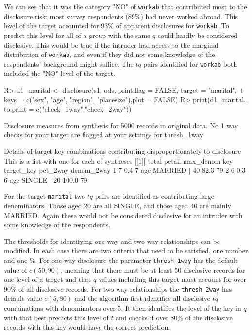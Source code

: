 \documentclass[12pt]{article}
\renewcommand{\baselinestretch}{1.5} %
\begin{document}
\renewcommand{\baselinestretch}{1.5}
We can see that it was the category "NO" of \texttt{workab} that contributed most to the
disclosure risk; most survey respondents (89\%) had never worked abroad. This level of
the target accounted for 93\% of apparent disclosures for \texttt{workab}. To
predict this level for all of a group with the same $q$ could hardly be considered 
disclosive. This would be true if the intruder had access to the marginal distribution
of \texttt{workab}, and even if they did not some knowledge of the respondents' background
might suffice. The $tq$ pairs identified for \texttt{workab} both included the "NO"
level of the target.
\renewcommand{\baselinestretch}{1.0}
\begin{Schunk}
\begin{Sinput}
R> d1_marital <- disclosure(s1, ods, print.flag = FALSE, target = "marital",
+     keys = c("sex", "age", "region", "placesize"),plot = FALSE)
R> print(d1_marital, to.print = c("check_1way","check_2way"))
\end{Sinput}
\begin{Soutput}
Disclosure measures from synthesis for 5000 records in original data.
No 1 way checks for your target are flagged at your settings for thresh_1way

 
Details of target-key combinations contributing disproportionately to disclosure
This is a list with one for each of syntheses
[[1]]
  total pctall max_denom key   target_key pct_2way denom_2way
1     7    0.4         7 age MARRIED | 40     82.3         79
2     6    0.3         6 age  SINGLE | 20    100.0         79
\end{Soutput}
\end{Schunk}
\renewcommand{\baselinestretch}{1.5}
For the target \texttt{marital} two $tq$ pairs are identified as contributing large denominators. Those aged 20 are all SINGLE, and those aged 40 are mainly MARRIED. Again these would not 
be considered disclosive for an intruder with some knowledge of the respondents.

The thresholds for identifying one-way and two-way relationships can be modified. In each case there are two criteria that need to be satisfied, one number and one \%. For one-way disclosure 
the parameter \texttt{thresh\_1way} has the default value of $c(50, 90)$, meaning that there must be at least 50 disclosive records for one level of a target and that $q$ values including this target must account for over 90\% of all disclosive records. For two way relationships the \texttt{thresh\_2way} has default value $c(5,80)$ and the algorithm first identifies all 
disclosive $tq$ combinations with denominators over 5. It then identifies the level of the key in $q$ with that best predicts this level of $t$ and checks if over 80\% of the disclosive records with this key would have the correct prediction. 
\end{document}
